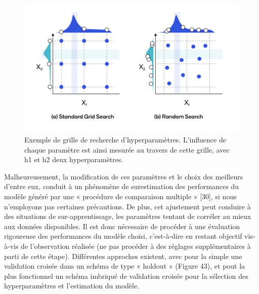 \begin{figure}[H]
    \centering
    \includegraphics[width=\linewidth]{contents/chapter_3/resources/hyperparameter_selection.png}
    \caption{Exemple de grille de recherche d’hyperparamètres. L’influence de chaque paramètre est ainsi mesurée au travers de cette grille, avec h1 et h2 deux hyperparamètres.}
    \label{fig:hyperparameter_selection}
\end{figure}

Malheureusement, la modification de ces paramètres et le choix des meilleurs d’entre eux, conduit à un phénomène de surestimation des performances du modèle généré par une « procédure de comparaison multiple » [30], si nous n’employons pas certaines précautions. De plus, cet ajustement peut conduire à des situations de sur-apprentissage, les paramètres tentant de corréler au mieux aux données disponibles. Il est donc nécessaire de procéder à une évaluation rigoureuse des performances du modèle choisi, c’est-à-dire en restant objectif vis-à-vis de l’observation réalisée (ne pas procéder à des réglages supplémentaires à parti de cette étape). Différentes approches existent, avec pour la simple une validation croisée dans un schéma de type « holdout » (Figure 43), et pout la plus fonctionnel un schéma imbriqué de validation croisée pour la sélection des hyperparamètres et l’estimation du modèle.
  
